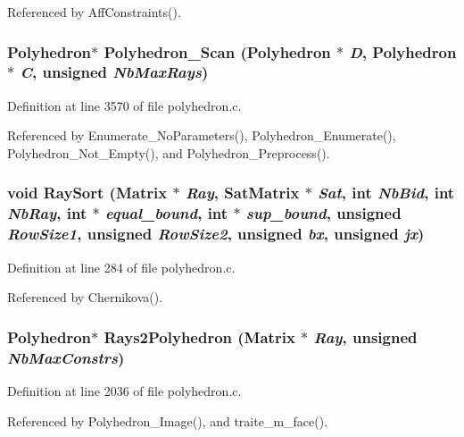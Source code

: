 Referenced by Aff\-Constraints().

\subsubsection{\setlength{\rightskip}{0pt plus 5cm}Polyhedron$\ast$ Polyhedron\_\-Scan (Polyhedron $\ast$ {\em D}, Polyhedron $\ast$ {\em C}, unsigned {\em Nb\-Max\-Rays})}\label{polyhedron_8c_a48}




Definition at line 3570 of file polyhedron.c.

Referenced by Enumerate\_\-No\-Parameters(), Polyhedron\_\-Enumerate(), Polyhedron\_\-Not\_\-Empty(), and Polyhedron\_\-Preprocess().

\subsubsection{\setlength{\rightskip}{0pt plus 5cm}void Ray\-Sort (Matrix $\ast$ {\em Ray}, {\bf Sat\-Matrix} $\ast$ {\em Sat}, int {\em Nb\-Bid}, int {\em Nb\-Ray}, int $\ast$ {\em equal\_\-bound}, int $\ast$ {\em sup\_\-bound}, unsigned {\em Row\-Size1}, unsigned {\em Row\-Size2}, unsigned {\em bx}, unsigned {\em jx})\hspace{0.3cm}{\tt  [static]}}\label{polyhedron_8c_a13}




Definition at line 284 of file polyhedron.c.

Referenced by Chernikova().

\subsubsection{\setlength{\rightskip}{0pt plus 5cm}Polyhedron$\ast$ Rays2Polyhedron (Matrix $\ast$ {\em Ray}, unsigned {\em Nb\-Max\-Constrs})}\label{polyhedron_8c_a26}




Definition at line 2036 of file polyhedron.c.

Referenced by Polyhedron\_\-Image(), and traite\_\-m\_\-face().

